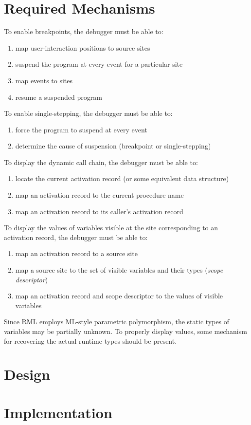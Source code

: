 \documentclass[12pt,a4paper]{article}
\begin{document}
\section{Required Mechanisms}
To enable breakpoints, the debugger must be able to:
\begin{enumerate}
\item map user-interaction positions to source sites
\item suspend the program at every event for a particular site
\item map events to sites
\item resume a suspended program
\end{enumerate}
To enable single-stepping, the debugger must be able to:
\begin{enumerate}
\item force the program to suspend at every event
\item determine the cause of suspension (breakpoint or single-stepping)
\end{enumerate}
To display the dynamic call chain, the debugger must be able to:
\begin{enumerate}
\item locate the current activation record (or some equivalent data structure)
\item map an activation record to the current procedure name
\item map an activation record to its caller's activation record
\end{enumerate}
To display the values of variables visible at the site corresponding
to an activation record, the debugger must be able to:
\begin{enumerate}
\item map an activation record to a source site
\item map a source site to the set of visible variables and their types (\emph{scope descriptor})
\item map an activation record and scope descriptor to the values of visible variables
\end{enumerate}
Since RML employs ML-style parametric polymorphism, the static types of variables
may be partially unknown. To properly display values, some mechanism for
recovering the actual runtime types should be present.
%
\section{Design}
%
\section{Implementation}
%
\nocite{AdamsM86,AppelDM88,AralGS89,Beander83,Cargill85,Gondzio87,HansonR96,Hennessy82,Heymann93,Johnson82,JohnsonK83,Kellomaki93,Klint79,O'DonnellH88,Paxon90,Redell89,Tolmach92,TolmachA95,Tsien93,Zellweger83}
\nocite{Appel89:notags,Goldberg91:pldi,Goldberg92:esop,GoldbergG92:lfp,AdityaC93:fpca,AdityaFH94:lfp,Tolmach94:lfp}
%


%
\end{document}
